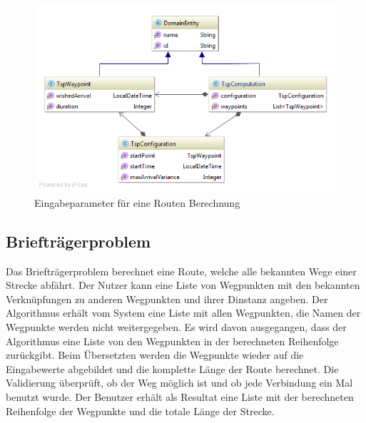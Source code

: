 \begin{figure}[h]
\centering
\includegraphics[scale=0.5]{images/probleme/tsp.png}
\caption[Eingabeparameter für eine Routen Berechnung]{Eingabeparameter für eine Routen Berechnung \selfmade{}}
\label{fig:tsp_input}
\end{figure}

%
%
%
%

\subsection{Briefträgerproblem}
Das Briefträgerproblem berechnet eine Route, welche alle bekannten Wege einer Strecke abfährt. Der Nutzer kann eine Liste von Wegpunkten mit den bekannten Verknüpfungen zu anderen 
Wegpunkten und ihrer Dinstanz angeben. Der Algorithmus erhält vom System eine Liste mit allen Wegpunkten, die Namen der Wegpunkte werden nicht weitergegeben. Es wird davon ausgegangen, 
dass der Algorithmus eine Liste von den Wegpunkten in der berechneten Reihenfolge zurückgibt. Beim Übersetzten werden die Wegpunkte wieder auf die Eingabewerte abgebildet und die komplette 
Länge der Route berechnet. Die Validierung überprüft, ob der Weg möglich ist und ob jede Verbindung ein Mal benutzt wurde. Der Benutzer erhält als Resultat eine Liste mit der berechneten 
Reihenfolge der Wegpunkte und die totale Länge der Strecke.

